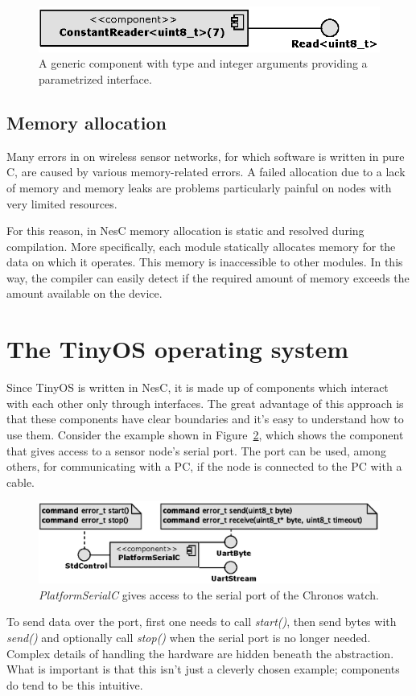 \begin{figure}[h]
  \centering
  \includegraphics{diagrams/generic_component.eps}
  \caption{A generic component with type and integer arguments
  providing a parametrized interface.}
  \label{fig:generic_component}
\end{figure}

\subsection{Memory allocation}
Many errors in on wireless sensor networks, for which software is written in pure C, are caused by various memory-related errors. A failed allocation due to a lack of memory and memory leaks are problems particularly painful on nodes with very limited resources.

For this reason, in NesC memory allocation is static and resolved during compilation. More specifically, each module statically allocates memory for the data on which it operates. This memory is inaccessible to other modules. In this way, the compiler can easily detect if the required amount of memory exceeds the amount available on the device.

\section{The TinyOS operating system}

Since TinyOS is written in NesC, it is made up of components which interact with each other only through interfaces. The great advantage of this approach is that these components have clear boundaries and it's easy to understand how to use them. Consider the example shown in Figure~\ref{fig:platform_serial}, which shows the component that gives access to a sensor node's serial port. The port can be used, among others, for communicating with a PC, if the node is connected to the PC with a cable.
\begin{figure}[h]
  \centering
  \includegraphics{diagrams/platform_serial.eps}
  \caption{\emph{PlatformSerialC} gives access to the serial port of the 
           Chronos watch.}
  \label{fig:platform_serial}
\end{figure}
To send data over the port, first one needs to call \emph{start()}, then send bytes with \emph{send()} and optionally call \emph{stop()} when the serial port is no longer needed. Complex details of handling the hardware are hidden beneath the abstraction. What is important is that this isn't just a cleverly chosen example; components do tend to be this intuitive.

